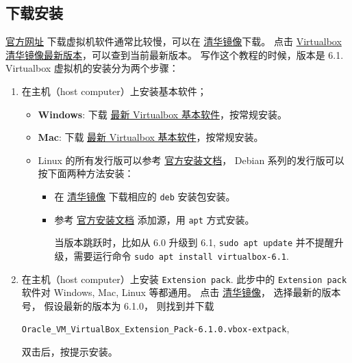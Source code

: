 \documentclass[
    11pt,
    cite=authoryear,
    device=phone,
    lang=cn,
    mode=simple,
    result=answer,
    toc=onecol,
]{elegantbook_sierxue}
\begin{document}
\subsection{下载安装}%
\label{sub:vbox-install}
\href{https://www.virtualbox.org/wiki/Downloads}{官方网址}
下载虚拟机软件通常比较慢，可以在
\href{https://mirror.tuna.tsinghua.edu.cn/virtualbox/}{清华镜像}下载。
点击
\href{https://mirror.tuna.tsinghua.edu.cn/virtualbox/LATEST.TXT}
{Virtualbox清华镜像最新版本}，可以查到当前最新版本。
写作这个教程的时候，版本是 6.1.
Virtualbox 虚拟机的安装分为两个步骤：
\begin{enumerate}
    \item 在主机（host computer）上安装基本软件；
        \begin{itemize}
            \item \textbf{Windows}: 下载
                \href{https://mirror.tuna.tsinghua.edu.cn/virtualbox/virtualbox-Win-latest.exe}
                {最新 Virtualbox 基本软件}，按常规安装。
            \item \textbf{Mac}: 下载
                \href{https://mirror.tuna.tsinghua.edu.cn/virtualbox/virtualbox-osx-latest.dmg}
                {最新 Virtualbox 基本软件}，按常规安装。
            \item Linux 的所有发行版可以参考
                \href{https://www.virtualbox.org/wiki/Linux_Downloads}{官方安装文档}，
                Debian 系列的发行版可以按下面两种方法安装：
                \begin{itemize}
                    \item 在
                        \href{https://mirror.tuna.tsinghua.edu.cn/virtualbox/}
                        {清华镜像}
                        下载相应的 \lstinline{deb} 安装包安装。
                    \item 参考
                        \href{https://www.virtualbox.org/wiki/Linux_Downloads}
                        {官方安装文档}
                        添加源，用 \lstinline{apt} 方式安装。
                        \begin{note}\label{note:vbox-apt-upgrade}
                           当版本跳跃时，比如从 6.0 升级到 6.1,
                           \lstinline{sudo apt update}
                           并不提醒升级，需要运行命令
                           \lstinline{sudo apt install virtualbox-6.1}.
                        \end{note}
                \end{itemize}
        \end{itemize}
    \item 在主机（host computer）上安装 \lstinline{Extension pack}.
        此步中的 \lstinline{Extension pack} 软件对 Windows, Mac, Linux
        等都通用。
        点击
        \href{https://mirror.tuna.tsinghua.edu.cn/virtualbox/}{清华镜像}，
        选择最新的版本号，
        假设最新的版本为 6.1.0，
        则找到并下载
        \begin{center}\label{center:vm-extension}
            \lstinline{Oracle_VM_VirtualBox_Extension_Pack-6.1.0.vbox-extpack},
        \end{center}
        双击后，按提示安装。
\end{enumerate}
\end{document}
